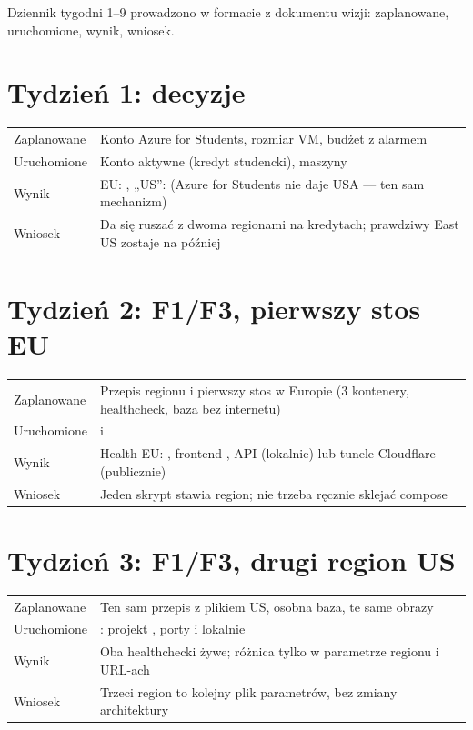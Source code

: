 Dziennik tygodni 1--9 prowadzono w formacie z dokumentu wizji: zaplanowane, uruchomione, wynik, wniosek.

\section{Tydzień 1: decyzje}
\begin{tabularx}{\textwidth}{@{}p{}Y@{}}
\toprule
Zaplanowane & Konto Azure for Students, rozmiar VM, budżet z alarmem \\
Uruchomione & Konto aktywne (kredyt studencki), maszyny  \\
Wynik & EU: , „US'':  (Azure for Students nie daje USA --- ten sam mechanizm) \\
Wniosek & Da się ruszać z dwoma regionami na kredytach; prawdziwy East US zostaje na później \\
\bottomrule
\end{tabularx}

\section{Tydzień 2: F1/F3, pierwszy stos EU}
\begin{tabularx}{\textwidth}{@{}p{}Y@{}}
\toprule
Zaplanowane & Przepis regionu i pierwszy stos w Europie (3 kontenery, healthcheck, baza bez internetu) \\
Uruchomione &  i  \\
Wynik & Health EU: , frontend , API  (lokalnie) lub tunele Cloudflare (publicznie) \\
Wniosek & Jeden skrypt stawia region; nie trzeba ręcznie sklejać compose \\
\bottomrule
\end{tabularx}

\section{Tydzień 3: F1/F3, drugi region US}
\begin{tabularx}{\textwidth}{@{}p{}Y@{}}
\toprule
Zaplanowane & Ten sam przepis z plikiem US, osobna baza, te same obrazy \\
Uruchomione & : projekt , porty  i  lokalnie \\
Wynik & Oba healthchecki żywe; różnica tylko w parametrze regionu i URL-ach \\
Wniosek & Trzeci region to kolejny plik parametrów, bez zmiany architektury \\
\bottomrule
\end{tabularx}

